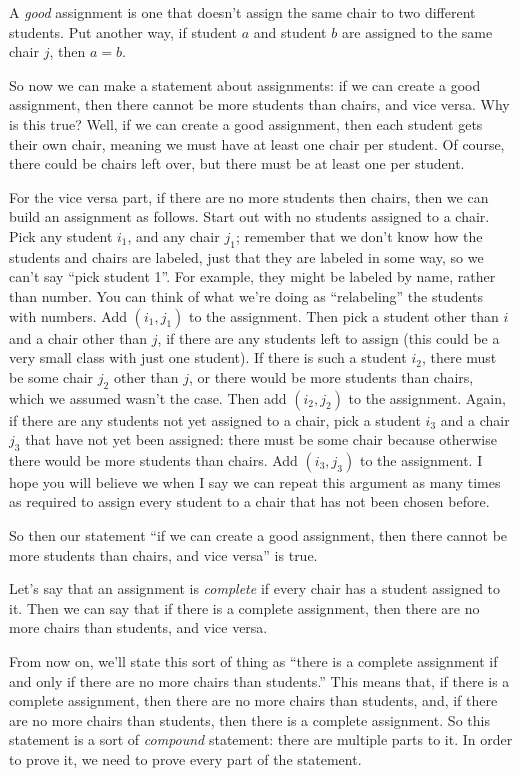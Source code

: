A \emph{good} assignment is one that doesn't assign the same chair to two different students.
Put another way, if student $a$ and student $b$ are assigned to the same chair $j$, then $a = b$. 

So now we can make a statement about assignments: if we can create a good assignment, then there cannot be more students than chairs, and vice versa.
Why is this true?
Well, if we can create a good assignment, then each student gets their own chair, meaning we must have at least one chair per student.
Of course, there could be chairs left over, but there must be at least one per student.

For the vice versa part, if there are no more students then chairs, then we can build an assignment as follows.
Start out with no students assigned to a chair.
Pick any student $i_1$, and any chair $j_1$; remember that we don't know how the students and chairs are labeled, just that they are labeled in some way, so we can't say ``pick student 1''.
For example, they might be labeled by name, rather than number.
You can think of what we're doing as ``relabeling'' the students with numbers.
Add $(i_1,j_1)$ to the assignment.
Then pick a student other than $i$ and a chair other than $j$, if there are any students left to assign (this could be a very small class with just one student).
If there is such a student $i_2$, there must be some chair $j_2$ other than $j$, or there would be more students than chairs, which we assumed wasn't the case.
Then add $(i_2, j_2)$ to the assignment.
Again, if there are any students not yet assigned to a chair, pick a student $i_3$ and a chair $j_3$ that have not yet been assigned: there must be some chair because otherwise there would be more students than chairs.
Add $(i_3, j_3)$ to the assignment.
I hope you will believe we when I say we can repeat this argument as many times as required to assign every student to a chair that has not been chosen before.

So then our statement ``if we can create a good assignment, then there cannot be more students than chairs, and vice versa'' is true.

Let's say that an assignment is \emph{complete} if every chair has a student assigned to it.
Then we can say that if there is a complete assignment, then there are no more chairs than students, and vice versa.

From now on, we'll state this sort of thing as ``there is a complete assignment if and only if there are no more chairs than students.''
This means that, if there is a complete assignment, then there are no more chairs than students, and, if there are no more chairs than students, then there is a complete assignment.
So this statement is a sort of \emph{compound} statement: there are multiple parts to it.
In order to prove it, we need to prove every part of the statement.

